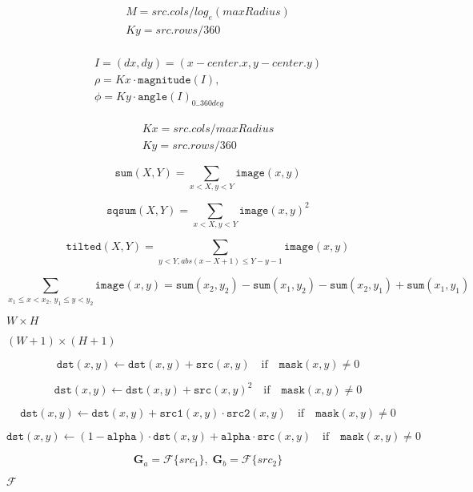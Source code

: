\documentclass{article}
\begin{document}
\[\begin{array}{l} M = src.cols / log_e(maxRadius) \\ Ky = src.rows / 360 \\ \end{array}\]
\pagebreak

\[\begin{array}{l} I = (dx,dy) = (x - center.x,y - center.y) \\ \rho = Kx \cdot \texttt{magnitude} (I) ,\\ \phi = Ky \cdot \texttt{angle} (I)_{0..360 deg} \end{array}\]
\pagebreak

\[\begin{array}{l} Kx = src.cols / maxRadius \\ Ky = src.rows / 360 \end{array}\]
\pagebreak

\[\texttt{sum} (X,Y) = \sum _{x<X,y<Y} \texttt{image} (x,y)\]
\pagebreak

\[\texttt{sqsum} (X,Y) = \sum _{x<X,y<Y} \texttt{image} (x,y)^2\]
\pagebreak

\[\texttt{tilted} (X,Y) = \sum _{y<Y,abs(x-X+1) \leq Y-y-1} \texttt{image} (x,y)\]
\pagebreak

\[\sum _{x_1 \leq x < x_2, \, y_1 \leq y < y_2} \texttt{image} (x,y) = \texttt{sum} (x_2,y_2)- \texttt{sum} (x_1,y_2)- \texttt{sum} (x_2,y_1)+ \texttt{sum} (x_1,y_1)\]
\pagebreak

$W \times H$
\pagebreak

$(W+1)\times (H+1)$
\pagebreak

\[\texttt{dst} (x,y) \leftarrow \texttt{dst} (x,y) + \texttt{src} (x,y) \quad \text{if} \quad \texttt{mask} (x,y) \ne 0\]
\pagebreak

\[\texttt{dst} (x,y) \leftarrow \texttt{dst} (x,y) + \texttt{src} (x,y)^2 \quad \text{if} \quad \texttt{mask} (x,y) \ne 0\]
\pagebreak

\[\texttt{dst} (x,y) \leftarrow \texttt{dst} (x,y) + \texttt{src1} (x,y) \cdot \texttt{src2} (x,y) \quad \text{if} \quad \texttt{mask} (x,y) \ne 0\]
\pagebreak

\[\texttt{dst} (x,y) \leftarrow (1- \texttt{alpha} ) \cdot \texttt{dst} (x,y) + \texttt{alpha} \cdot \texttt{src} (x,y) \quad \text{if} \quad \texttt{mask} (x,y) \ne 0\]
\pagebreak

\[\mathbf{G}_a = \mathcal{F}\{src_1\}, \; \mathbf{G}_b = \mathcal{F}\{src_2\}\]
\pagebreak

$\mathcal{F}$
\pagebreak
\end{document}
